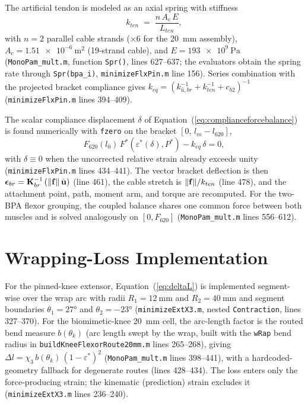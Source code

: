 The artificial tendon is modeled as an axial spring with stiffness
\begin{equation}
    k_{ten} \;=\; \frac{n\,A_{c}\,E}{L_{ten}},
    \label{eq:app_tendon}
\end{equation}
with $n=2$ parallel cable strands ($\times 6$ for the \qty{20}{\mm} assembly), $A_{c} = \qty{1.51e-6}{\metre\squared}$ (19-strand cable), and $E = \qty{193e9}{\pascal}$ (\nolinkurl{MonoPam_mult.m}, function \texttt{Spr()}, lines 627--637; the evaluators obtain the spring rate through \nolinkurl{Spr(bpa_i)}, \texttt{minimizeFlxPin.m} line 156). Series combination with the projected bracket compliance gives $k_{eq} = \left(k_{\hat{u},br}^{-1} + k_{ten}^{-1} + c_{b2}\right)^{-1}$ (\texttt{minimizeFlxPin.m} lines 394--409).

The scalar compliance displacement $\delta$ of Equation~(\ref{eq:complianceforcebalance}) is found numerically with \texttt{fzero} on the bracket $[0,\, l_{m}-l_{620}]$,
\begin{equation}
    F_{620}(l_{0})\,F^{*}\!\left(\varepsilon^{*}(\delta),P^{*}\right) - k_{eq}\,\delta = 0,
    \label{eq:app_forcebalance}
\end{equation}
with $\delta \equiv 0$ when the uncorrected relative strain already exceeds unity (\texttt{minimizeFlxPin.m} lines 434--441). The vector bracket deflection is then $\boldsymbol{\epsilon}_{br} = \mathbf{K}_{br}^{-1}\left(\lVert\mathbf{f}\rVert\,\hat{\mathbf{u}}\right)$ (line 461), the cable stretch is $\lVert\mathbf{f}\rVert/k_{ten}$ (line 478), and the attachment point, path, moment arm, and torque are recomputed. For the two-BPA flexor grouping, the coupled balance shares one common force between both muscles and is solved analogously on $[0, F_{620}]$ (\nolinkurl{MonoPam_mult.m} lines 556--612).

\section{Wrapping-Loss Implementation}

For the pinned-knee extensor, Equation~(\ref{eq:deltaL}) is implemented segment-wise over the wrap arc with radii $R_1 = \qty{12}{\mm}$ and $R_2 = \qty{40}{\mm}$ and segment boundaries $\theta_{1} = \ang{27}$ and $\theta_{2} = \ang{-23}$ (\texttt{minimizeExtX3.m}, nested \texttt{Contraction}, lines 327--370). For the biomimetic-knee \qty{20}{\mm} cell, the arc-length factor is the routed bend measure $b(\theta_{k})$ (arc length swept by the wrap, built with the \texttt{wRap} bend radius in \texttt{buildKneeFlexorRoute20mm.m} lines 265--268), giving $\Delta l = \chi_{3}\, b(\theta_{k})\,(1-\varepsilon^{*})^{2}$ (\nolinkurl{MonoPam_mult.m} lines 398--441), with a hardcoded-geometry fallback for degenerate routes (lines 428--434). The loss enters only the force-producing strain; the kinematic (prediction) strain excludes it (\texttt{minimizeExtX3.m} lines 236--240).

